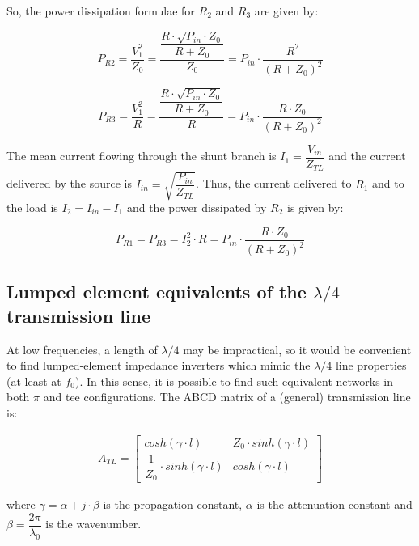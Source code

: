 \noindent So, the power dissipation formulae for $R_2$ and $R_3$ are given by:

\begin{equation}
P_{R2} = \dfrac{V_1^2}{Z_0} = \dfrac{\dfrac{R \cdot \sqrt{P_{in} \cdot Z_0}}{R + Z_0}}{Z_0} = P_{in} \cdot \dfrac{R^2}{(R + Z_0)^2}
\end{equation}

\begin{equation}
P_{R3} = \dfrac{V_1^2}{R} = \dfrac{\dfrac{R \cdot \sqrt{P_{in} \cdot Z_0}}{R + Z_0}}{R} = P_{in} \cdot \dfrac{R \cdot Z_0}{(R + Z_0)^2}
\end{equation}

\noindent The mean current flowing through the shunt branch is $I_{1} = \dfrac{V_{in}}{Z_{TL}}$ and the current delivered by the source is $I_{in} = \sqrt{\dfrac{P_{in}}{Z_{TL}}}$. Thus, the current delivered to $R_1$ and to the load is $I_{2} = I_{in} - I_{1}$ and the power dissipated by $R_2$ is given by:

\begin{equation}
P_{R1} = P_{R3} = I_{2}^2 \cdot R = P_{in} \cdot \dfrac{R \cdot Z_0}{(R + Z_0)^2}
\end{equation}

\clearpage
\subsection{Lumped element equivalents of the $\lambda/4$ transmission line}

\noindent At low frequencies, a length of $\lambda/4$ may be impractical, so it would be convenient to find lumped-element impedance inverters which mimic the $\lambda/4$ line properties (at least at $f_0$). In this sense, it is possible to find such equivalent networks in both $\pi$ and tee configurations. The ABCD matrix of a (general) transmission line is:

\begin{gather}
  A_{TL} = 
 \begin{bmatrix} cosh(\gamma \cdot l) & Z_0 \cdot sinh(\gamma \cdot l) \\ \dfrac{1}{Z_0} \cdot sinh(\gamma \cdot l) & cosh(\gamma \cdot l) \end{bmatrix}
\label{eq:trasmission_line_general}
\end{gather}

\noindent where $\gamma = \alpha + j \cdot \beta$ is the propagation constant, $\alpha$ is the attenuation constant and $\beta = \dfrac{2\pi}{\lambda_0}$ is the wavenumber.
\medskip

